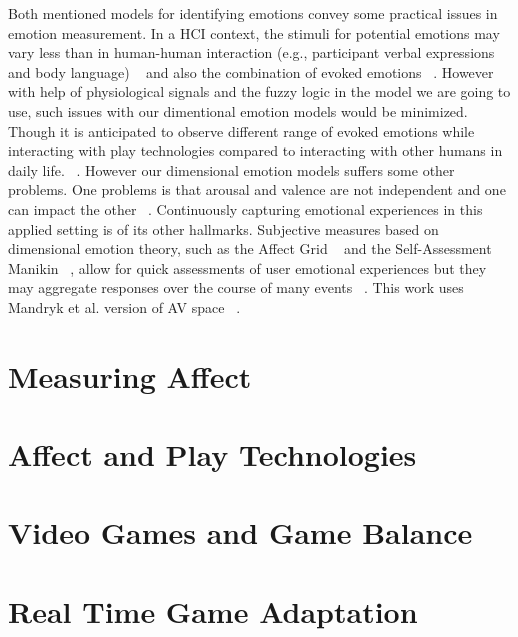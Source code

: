 \documentclass{uofsthesis-cs}
\begin{document}
Both mentioned models for identifying emotions convey some practical issues in emotion measurement. In a HCI context, the stimuli for potential emotions may vary less than in human-human interaction (e.g., participant verbal expressions and body language) ~\cite{zhang2010service} and also the combination of evoked emotions ~\cite{peter2006emotion}. However with help of physiological signals and the fuzzy logic in the model we are going to use, such issues with our dimentional emotion models would be minimized. Though it is anticipated to observe different range of evoked emotions while interacting with play technologies compared to interacting with other humans in daily life. ~\cite{zhang2010service}. However our dimensional emotion models suffers some other problems. One problems is that arousal and valence are not independent and one can impact the other ~\cite{mandryk2007fuzzy}. Continuously capturing emotional experiences in this applied setting is of its other hallmarks. Subjective measures based on dimensional emotion theory, such as the Affect Grid ~\cite{russell1989affect} and the Self-Assessment Manikin ~\cite{bradley1994measuring}, allow for quick assessments of user emotional experiences but they may aggregate responses over the course of many events ~\cite{zhang2010service}. This work uses Mandryk et al. version of AV space ~\cite{mandryk2007fuzzy}.

\section{Measuring Affect}

\section{Affect and Play Technologies}

\section{Video Games and Game Balance}

\section{Real Time Game Adaptation}
\end{document}
